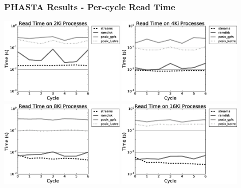 \documentclass{beamer}
\begin{document}
\begin{frame}
  \frametitle{PHASTA Results - Per-cycle Read Time}
  \centering
  \includegraphics[width=0.45\textwidth]{../imp/results/phasta-dambreak/theta/chef2048read.eps}
  \includegraphics[width=0.45\textwidth]{../imp/results/phasta-dambreak/theta/chef4096read.eps}\\
  \includegraphics[width=0.45\textwidth]{../imp/results/phasta-dambreak/theta/chef8192read.eps}
  \includegraphics[width=0.45\textwidth]{../imp/results/phasta-dambreak/theta/chef16384read.eps}\\
\end{frame}
\end{document}
